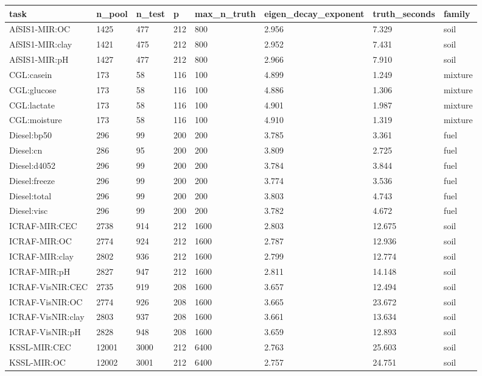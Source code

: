 \begin{tabular}{llllllll}
\hline
task & n\_pool & n\_test & p & max\_n\_truth & eigen\_decay\_exponent & truth\_seconds & family \\
\hline
AfSIS1-MIR:OC & 1425 & 477 & 212 & 800 & 2.956 & 7.329 & soil \\
AfSIS1-MIR:clay & 1421 & 475 & 212 & 800 & 2.952 & 7.431 & soil \\
AfSIS1-MIR:pH & 1427 & 477 & 212 & 800 & 2.966 & 7.910 & soil \\
CGL:casein & 173 & 58 & 116 & 100 & 4.899 & 1.249 & mixture \\
CGL:glucose & 173 & 58 & 116 & 100 & 4.886 & 1.306 & mixture \\
CGL:lactate & 173 & 58 & 116 & 100 & 4.901 & 1.987 & mixture \\
CGL:moisture & 173 & 58 & 116 & 100 & 4.910 & 1.319 & mixture \\
Diesel:bp50 & 296 & 99 & 200 & 200 & 3.785 & 3.361 & fuel \\
Diesel:cn & 286 & 95 & 200 & 200 & 3.809 & 2.725 & fuel \\
Diesel:d4052 & 296 & 99 & 200 & 200 & 3.784 & 3.844 & fuel \\
Diesel:freeze & 296 & 99 & 200 & 200 & 3.774 & 3.536 & fuel \\
Diesel:total & 296 & 99 & 200 & 200 & 3.803 & 4.743 & fuel \\
Diesel:visc & 296 & 99 & 200 & 200 & 3.782 & 4.672 & fuel \\
ICRAF-MIR:CEC & 2738 & 914 & 212 & 1600 & 2.803 & 12.675 & soil \\
ICRAF-MIR:OC & 2774 & 924 & 212 & 1600 & 2.787 & 12.936 & soil \\
ICRAF-MIR:clay & 2802 & 936 & 212 & 1600 & 2.799 & 12.774 & soil \\
ICRAF-MIR:pH & 2827 & 947 & 212 & 1600 & 2.811 & 14.148 & soil \\
ICRAF-VisNIR:CEC & 2735 & 919 & 208 & 1600 & 3.657 & 12.494 & soil \\
ICRAF-VisNIR:OC & 2774 & 926 & 208 & 1600 & 3.665 & 23.672 & soil \\
ICRAF-VisNIR:clay & 2803 & 937 & 208 & 1600 & 3.661 & 13.634 & soil \\
ICRAF-VisNIR:pH & 2828 & 948 & 208 & 1600 & 3.659 & 12.893 & soil \\
KSSL-MIR:CEC & 12001 & 3000 & 212 & 6400 & 2.763 & 25.603 & soil \\
KSSL-MIR:OC & 12002 & 3001 & 212 & 6400 & 2.757 & 24.751 & soil \\

\end{tabular}
